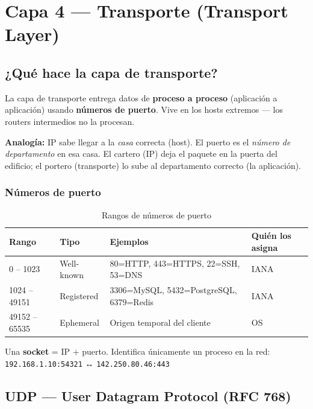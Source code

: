 \chapter{ Capa 4 --- Transporte (Transport Layer)}

\section{ ¿Qué hace la capa de transporte?}

\begin{concepto}
La capa de transporte entrega datos de \textbf{proceso a proceso}
(aplicación a aplicación) usando \textbf{números de puerto}.
Vive en los hosts extremos --- los routers intermedios no la procesan.

 \textbf{Analogía:} IP sabe llegar a la \textit{casa} correcta (host).
El puerto es el \textit{número de departamento} en esa casa. El cartero (IP)
deja el paquete en la puerta del edificio; el portero (transporte) lo sube
al departamento correcto (la aplicación).
\end{concepto}

\subsection{Números de puerto}

\begin{table}[h!]
\centering
\renewcommand{\arraystretch}{1.3}
\begin{tabular}{llll}
\toprule
\textbf{Rango} & \textbf{Tipo} & \textbf{Ejemplos} & \textbf{Quién los asigna} \\
\midrule
0 -- 1023    & Well-known    & 80=HTTP, 443=HTTPS, 22=SSH, 53=DNS & IANA \\
1024 -- 49151 & Registered   & 3306=MySQL, 5432=PostgreSQL, 6379=Redis & IANA \\
49152 -- 65535 & Ephemeral   & Origen temporal del cliente & OS \\
\bottomrule
\end{tabular}
\caption{Rangos de números de puerto}
\end{table}

Una \textbf{socket} = IP + puerto. Identifica únicamente un proceso en la red:
\texttt{192.168.1.10:54321} ↔ \texttt{142.250.80.46:443}

\section{ UDP --- User Datagram Protocol (RFC 768)}

